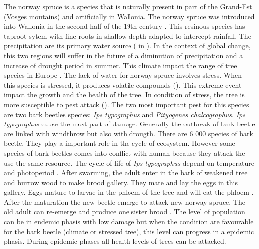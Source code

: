 \documentclass[3p,procedia]{elsarticle}
\begin{document}
The norway spruce is a species that is naturally present in part of the Grand-Est (Vosges moutains)  and artificially  in Wallonia. 
The norway spruce was introduced into Wallonia in the second half of the 19th century \citep{Noirfalise_1975}.
This resinous species has taproot sytem with fine roots in shallow depth adapted to intercept rainfall. 
The precipitation are its primary water source (\cite{weihe_1984} in \cite{tjoeker_biology_nodate}).
In the context of global change, this two regions will suffer in the future of a diminution of precipitation and a increase of drought period in summer. 
This climate impact the range of tree species in Europe  \citep{hanewinkel2013climate}.
The lack of water for norway spruce involves stress. When this species is stressed, it produces volatile compounds (\cite{netherer_interactions_2021}). %
This extreme event impact the growth and the health of the tree.
In condition of stress, the tree is more susceptible to pest attack (\cite{netherer_waterlimiting_2015}).
The two most important pest for this species are two  bark beetles species: \textit{Ips typographus} and \textit{Pityogenes chalcographus}. 
\textit{Ips typographus} cause the most part of damage. Generally the outbreak of bark beetle are linked with windthrow but also with drougth. 
There are 6 000 species of bark beetle. 
They play a important role in the cycle of ecosystem. 
However some species of bark beetles comes into conflict with human because they attack the use the same resource\citep{raffa_natural_2015}.%
The cycle of life of \textit{Ips typographus} depend on temperature and photoperiod \citep{baier_phenipscomprehensive_2007,annila_influence_1969}.
After swarming, the adult enter in the bark of weakened tree and burrow wood to make brood gallery.
They mate and lay the eggs in this gallery. 
Eggs mature to larvae in the phloem of the tree and will eat the phloem \citep{hlasny_bark_2021}.
After the maturation the new beetle emerge to attack new norway spruce.
The old adult can re-emerge and produce one sister brood \citep{zolubas_1995}.
The level of population can be in endemic phasis with low damage but when the condition are favourable for the bark beetle (climate or stressed tree), this level  
can progress in a epidemic phasis\citep{kautz_individual_2014}.
During epidemic phases all health levels of trees can be attacked.
 
\end{document}
